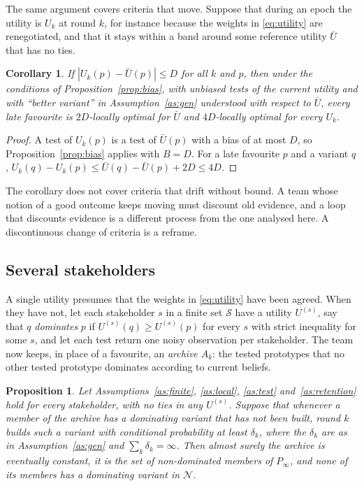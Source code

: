 \documentclass[10pt,twocolumn]{article}
\newcommand{\Nb}{\mathcal{N}}
\newtheorem{proposition}{Proposition}
\newtheorem{corollary}{Corollary}
\theoremstyle{definition}
\begin{document}
The same argument covers criteria that move. Suppose that during an epoch the utility is $U_k$ at round $k$, for instance because the weights in \eqref{eq:utility} are renegotiated, and that it stays within a band around some reference utility $\bar U$ that has no ties.

\begin{corollary}
\label{cor:drift}
If $|U_k(p)-\bar U(p)|\le D$ for all $k$ and $p$, then under the conditions of Proposition~\ref{prop:bias}, with unbiased tests of the current utility and with ``better variant'' in Assumption~\ref{as:gen} understood with respect to $\bar U$, every late favourite is $2D$-locally optimal for $\bar U$ and $4D$-locally optimal for every $U_k$.
\end{corollary}

\begin{proof}
A test of $U_k(p)$ is a test of $\bar U(p)$ with a bias of at most $D$, so Proposition~\ref{prop:bias} applies with $B=D$. For a late favourite $p$ and a variant $q$, $U_k(q)-U_k(p)\le\bar U(q)-\bar U(p)+2D\le4D$.
\end{proof}

The corollary does not cover criteria that drift without bound. A team whose notion of a good outcome keeps moving must discount old evidence, and a loop that discounts evidence is a different process from the one analysed here. A discontinuous change of criteria is a reframe.

\subsection{Several stakeholders}
\label{sec:pareto}

A single utility presumes that the weights in \eqref{eq:utility} have been agreed. When they have not, let each stakeholder $s$ in a finite set $\mathcal S$ have a utility $U^{(s)}$, say that $q$ \emph{dominates} $p$ if $U^{(s)}(q)\ge U^{(s)}(p)$ for every $s$ with strict inequality for some $s$, and let each test return one noisy observation per stakeholder. The team now keeps, in place of a favourite, an \emph{archive} $A_k$: the tested prototypes that no other tested prototype dominates according to current beliefs.

\begin{proposition}
\label{prop:pareto}
Let Assumptions~\ref{as:finite}, \ref{as:local}, \ref{as:test} and~\ref{as:retention} hold for every stakeholder, with no ties in any $U^{(s)}$. Suppose that whenever a member of the archive has a dominating variant that has not been built, round $k$ builds such a variant with conditional probability at least $\delta_k$, where the $\delta_k$ are as in Assumption~\ref{as:gen} and $\sum_k\delta_k=\infty$. Then almost surely the archive is eventually constant, it is the set of non-dominated members of $P_\infty$, and none of its members has a dominating variant in $\Nb$.
\end{proposition}
\end{document}
